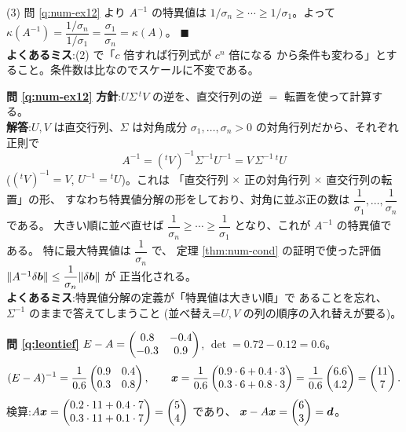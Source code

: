 (3) 問 \ref{q:num-ex12} より $A^{-1}$ の特異値は
$1/\sigma_n \ge \cdots \ge 1/\sigma_1$。よって
$\kappa(A^{-1}) = \dfrac{1/\sigma_n}{1/\sigma_1}
= \dfrac{\sigma_1}{\sigma_n} = \kappa(A)$。 $\blacksquare$\\
\textbf{よくあるミス}:(2) で「$c$ 倍すれば行列式が $c^n$ 倍になる
から条件も変わる」とすること。条件数は比なのでスケールに不変である。

\bigskip
\noindent\textbf{問 \ref{q:num-ex12}}\quad
\textbf{方針}:$U\Sigma\,{}^tV$ の逆を、直交行列の逆
$= $ 転置を使って計算する。\\
\textbf{解答}:$U, V$ は直交行列、$\Sigma$ は対角成分
$\sigma_1, \dots, \sigma_n > 0$ の対角行列だから、それぞれ正則で
\[
A^{-1} = ({}^tV)^{-1}\Sigma^{-1}U^{-1} = V\,\Sigma^{-1}\,{}^tU
\]
($({}^tV)^{-1} = V$, $U^{-1} = {}^tU$)。これは
「直交行列 $\times$ 正の対角行列 $\times$ 直交行列の転置」の形、
すなわち特異値分解の形をしており、対角に並ぶ正の数は
$\dfrac{1}{\sigma_1}, \dots, \dfrac{1}{\sigma_n}$ である。
大きい順に並べ直せば $\dfrac{1}{\sigma_n} \ge \cdots \ge
\dfrac{1}{\sigma_1}$ となり、これが $A^{-1}$ の特異値である。
特に最大特異値は $\dfrac{1}{\sigma_n}$ で、
定理 \ref{thm:num-cond} の証明で使った評価
$\|A^{-1}\delta\bm{b}\| \le \dfrac{1}{\sigma_n}\|\delta\bm{b}\|$ が
正当化される。\\
\textbf{よくあるミス}:特異値分解の定義が「特異値は大きい順」で
あることを忘れ、$\Sigma^{-1}$ のままで答えてしまうこと
(並べ替え=$U, V$ の列の順序の入れ替えが要る)。

\bigskip
\noindent\textbf{問 \ref{q:leontief}}\quad
$E - A = \begin{pmatrix}0.8 & -0.4 \\ -0.3 & 0.9\end{pmatrix}$, $\det = 0.72 - 0.12 = 0.6$。
\[
(E - A)^{-1} = \frac{1}{0.6}\begin{pmatrix}0.9 & 0.4 \\ 0.3 & 0.8\end{pmatrix},
\qquad
\bm{x} = \frac{1}{0.6}\begin{pmatrix}0.9 \cdot 6 + 0.4 \cdot 3 \\
0.3 \cdot 6 + 0.8 \cdot 3\end{pmatrix} = \frac{1}{0.6}\begin{pmatrix}6.6 \\ 4.2\end{pmatrix} = \begin{pmatrix}11 \\ 7\end{pmatrix}.
\]
検算:$A\bm{x} = \begin{pmatrix}0.2 \cdot 11 + 0.4 \cdot 7 \\
0.3 \cdot 11 + 0.1 \cdot 7\end{pmatrix} = \begin{pmatrix}5 \\ 4\end{pmatrix}$ であり、
$\bm{x} - A\bm{x} = \begin{pmatrix}6 \\ 3\end{pmatrix} = \bm{d}$。


